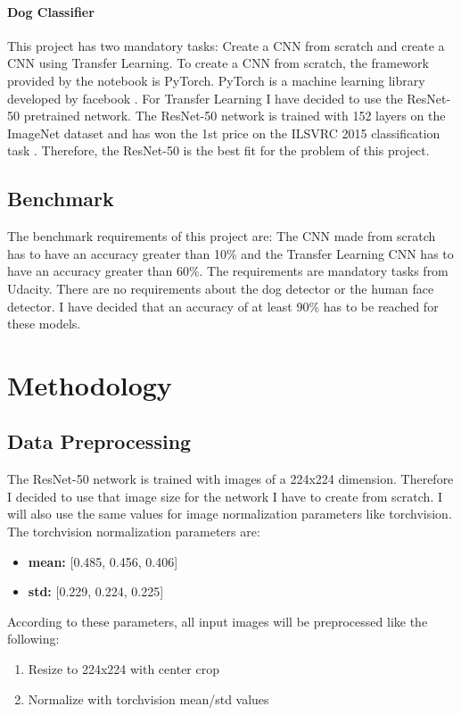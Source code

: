 \documentclass{article}
\begin{document}
\paragraph{Dog Classifier} This project has two mandatory tasks: Create a CNN from scratch and create a CNN using Transfer Learning. To create a CNN from scratch, the framework provided by the notebook is PyTorch. PyTorch is a machine learning library developed by facebook \cite{pytorch}.\newline
For Transfer Learning I have decided to use the ResNet-50 pretrained network. The ResNet-50 network is trained with 152 layers on the ImageNet dataset and has won the 1st price on the ILSVRC 2015 classification task \cite{resnet}. Therefore, the ResNet-50 is the best fit for the problem of this project.

\subsection{Benchmark} \label{su_benchmark}
The benchmark requirements of this project are: The CNN made from scratch has to have an accuracy greater than 10\% and the Transfer Learning CNN has to have an accuracy greater than 60\%. The requirements are mandatory tasks from Udacity.\newline
There are no requirements about the dog detector or the human face detector. I have decided that an accuracy of at least 90\% has to be reached for these models.

\section{Methodology} \label{s_methodology}

\subsection{Data Preprocessing} \label{su_preprocessing}
The ResNet-50 network is trained with images of a 224x224 dimension. Therefore I decided to use that image size for the network I have to create from scratch. I will also use the same values for image normalization parameters like torchvision. The torchvision normalization parameters are:
\begin{itemize}
    \item \textbf{mean:} [0.485, 0.456, 0.406]
    \item \textbf{std:} [0.229, 0.224, 0.225]
\end{itemize}
According to these parameters, all input images will be preprocessed like the following:
\begin{enumerate}
	\item Resize to 224x224 with center crop
	\item Normalize with torchvision mean/std values
\end{enumerate}
\end{document}
